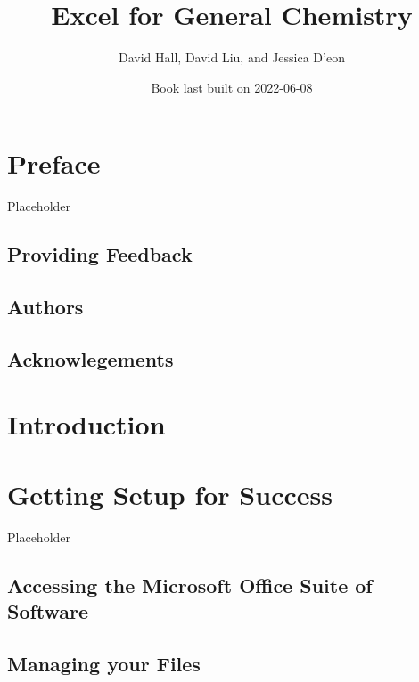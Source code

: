 \documentclass[
]{book}
\title{Excel for General Chemistry}
\author{David Hall, David Liu, and Jessica D'eon}
\date{Book last built on 2022-06-08}
\begin{document}
\maketitle

{
\setcounter{tocdepth}{1}
\tableofcontents
}
\hypertarget{preface}{%
\chapter*{Preface}\label{preface}}

Placeholder

\hypertarget{providing-feedback}{%
\section*{Providing Feedback}\label{providing-feedback}}

\hypertarget{authors}{%
\section*{Authors}\label{authors}}

\hypertarget{acknowlegements}{%
\section*{Acknowlegements}\label{acknowlegements}}

\hypertarget{intro}{%
\chapter{Introduction}\label{intro}}

\hypertarget{capabilities}{%
\chapter{Getting Setup for Success}\label{capabilities}}

Placeholder

\hypertarget{accessing-the-microsoft-office-suite-of-software}{%
\section{Accessing the Microsoft Office Suite of Software}\label{accessing-the-microsoft-office-suite-of-software}}

\hypertarget{managing-your-files}{%
\section{Managing your Files}\label{managing-your-files}}
\end{document}

